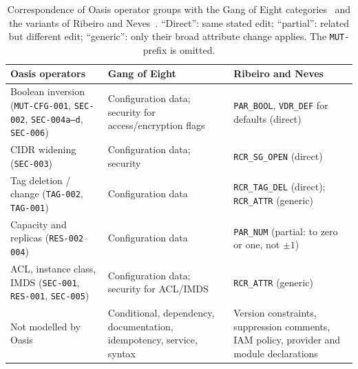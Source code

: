 \documentclass[3p,times,procedia]{elsarticle}
\newcommand{\code}[1]{\texttt{#1}}
\begin{document}
\begin{table}[ht]
\caption{Correspondence of Oasis operator groups with the Gang of Eight categories~\cite{gangofeight} and the variants of Ribeiro and Neves~\cite{ribeiro}. ``Direct'': same stated edit; ``partial'': related but different edit; ``generic'': only their broad attribute change applies. The \code{MUT-} prefix is omitted.}\label{tab:mapping}
\small\begin{tabularx}{\linewidth}{@{}>{\raggedright\arraybackslash}p{4.2cm}>{\raggedright\arraybackslash}p{3.3cm}>{\raggedright\arraybackslash}X@{}}\toprule
Oasis operators & Gang of Eight & Ribeiro and Neves\\\midrule
Boolean inversion (\code{MUT-CFG-001}, \code{SEC-002}, \code{SEC-004a--d}, \code{SEC-006}) & Configuration data; security for access/encryption flags & \code{PAR\_BOOL}, \code{VDR\_DEF} for defaults (direct)\\
CIDR widening (\code{SEC-003}) & Configuration data; security & \code{RCR\_SG\_OPEN} (direct)\\
Tag deletion / change (\code{TAG-002}, \code{TAG-001}) & Configuration data & \code{RCR\_TAG\_DEL} (direct); \code{RCR\_ATTR} (generic)\\
Capacity and replicas (\code{RES-002}--\code{004}) & Configuration data & \code{PAR\_NUM} (partial: to zero or one, not $\pm1$)\\
ACL, instance class, IMDS (\code{SEC-001}, \code{RES-001}, \code{SEC-005}) & Configuration data; security for ACL/IMDS & \code{RCR\_ATTR} (generic)\\\midrule
Not modelled by Oasis & Conditional, dependency, documentation, idempotency, service, syntax & Version constraints, suppression comments, IAM policy, provider and module declarations\\\bottomrule
\end{tabularx}\end{table}
\end{document}

